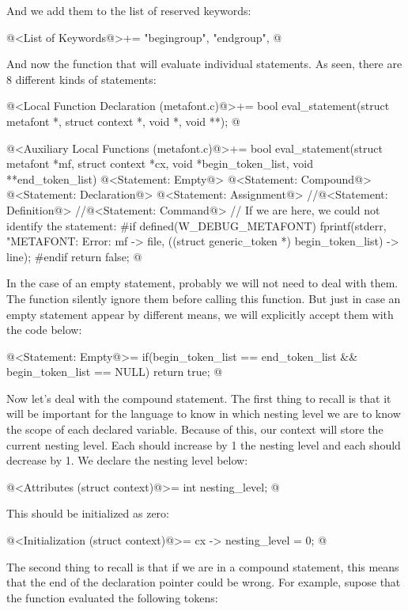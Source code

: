 And we add them to the list of reserved keywords:

\iniciocodigo
@<List of Keywords@>+=
"begingroup", "endgroup",
@
\fimcodigo

And now the function that will evaluate individual statements. As
seen, there are 8 different kinds of statements:

\iniciocodigo
@<Local Function Declaration (metafont.c)@>+=
bool eval_statement(struct metafont *, struct context *, void *, void **);
@
\fimcodigo


\iniciocodigo
@<Auxiliary Local Functions (metafont.c)@>+=
bool eval_statement(struct metafont *mf, struct context *cx,
                     void *begin_token_list, void **end_token_list){
  @<Statement: Empty@>
  @<Statement: Compound@>
  @<Statement: Declaration@>
  @<Statement: Assignment@>
  //@<Statement: Definition@> 
  //@<Statement: Command@>
  // If we are here, we could not identify the statement:
#if defined(W_DEBUG_METAFONT)
    fprintf(stderr, "METAFONT: Error: %
            mf -> file,
            ((struct generic_token *) begin_token_list) -> line);
#endif
  return false;
}
@
\fimcodigo

In the case of an empty statement, probably we will not need to deal
with them. The function 
silently ignore them before calling this function. But just in case an
empty statement appear by different means, we will explicitly accept
them with the code below:

\iniciocodigo
@<Statement: Empty@>=
if(begin_token_list == end_token_list && begin_token_list == NULL)
  return true;
@
\fimcodigo

Now let's deal with the compound statement. The first thing to recall
is that it will be important for the language to know in which nesting
level we are to know the scope of each declared variable. Because of
this, our context will store the current nesting
level. Each  should increase by 1 the nesting
level and each  should decrease by 1. We declare
the nesting level below:

\iniciocodigo
@<Attributes (struct context)@>=
  int nesting_level;
@
\fimcodigo

This should be initialized as zero:

\iniciocodigo
@<Initialization (struct context)@>=
  cx -> nesting_level = 0;
@
\fimcodigo


The second thing to recall is that if we are in a compound statement,
this means that the end of the declaration pointer could be wrong.
For example, supose that the
function  evaluated the
following tokens:

